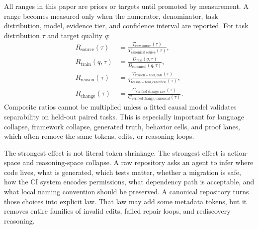 All ranges in this paper are priors or targets until promoted by measurement. A range becomes measured only when the numerator, denominator, task distribution, model, evidence tier, and confidence interval are reported. For task distribution $\tau$ and target quality $q$:
\begin{align}
R_{\mathrm{source}}(\tau)
  &= \frac{T_{\mathrm{raw\ source}}(\tau)}
          {T_{\mathrm{canonical\ source}}(\tau)}, \\
R_{\mathrm{train}}(q,\tau)
  &= \frac{D_{\mathrm{raw}}(q,\tau)}
          {D_{\mathrm{canonical}}(q,\tau)}, \\
R_{\mathrm{reason}}(\tau)
  &= \frac{T_{\mathrm{reason+tool,raw}}(\tau)}
          {T_{\mathrm{reason+tool,canonical}}(\tau)}, \\
R_{\mathrm{change}}(\tau)
  &= \frac{C_{\mathrm{verified\ change,raw}}(\tau)}
          {C_{\mathrm{verified\ change,canonical}}(\tau)}.
\end{align}
Composite ratios cannot be multiplied unless a fitted causal model validates separability on held-out paired tasks. This is especially important for language collapse, framework collapse, generated truth, behavior cells, and proof lanes, which often remove the same tokens, edits, or reasoning loops.

The strongest effect is not literal token shrinkage. The strongest effect is action-space and reasoning-space collapse. A raw repository asks an agent to infer where code lives, what is generated, which tests matter, whether a migration is safe, how the CI system encodes permissions, what dependency path is acceptable, and what local naming convention should be preserved. A canonical repository turns those choices into explicit law. That law may add some metadata tokens, but it removes entire families of invalid edits, failed repair loops, and rediscovery reasoning.

